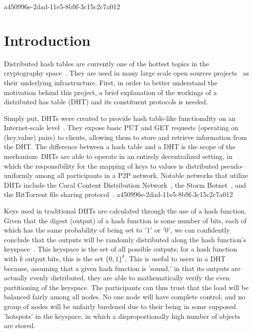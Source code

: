 \documentclass[12pt]{article}
\begin{document}
a450996e-2dad-11e5-8b9f-3c15c2c7a012\section{Introduction}
\par Distributed hash tables are currently one of the hottest topics in the cryptography space~\cite{Stoica:2001dj,Rowstron:2001ea,Ratnasamy:2001wn}. They are used in many large scale open sources projects~\cite{Freitas:2013tb,Xu:2010vs,Perfitt:2010fh} as their underlying infrastructure. First, in order to better understand the motivation behind this project, a brief explanation of the workings of a distributed has table (DHT) and its constituent protocols is needed.

\par Simply put, DHTs were created to provide hash table-like functionality on an Internet-scale level~\cite{Ratnasamy:2001wn}. They expose basic PUT and GET requests (operating on (key,value) pairs) to clients, allowing them to store and retrieve information from the DHT. The difference between a hash table and a DHT is the scope of the mechanism: DHTs are able to operate in an entirely decentralized setting, in which the responsibility for the mapping of keys to values is distributed pseudo-uniformly among all participants in a P2P network. Notable networks that utilize DHTs include the Coral Content Distribution Network~\cite{Freedman:2004vb}, the Storm Botnet~\cite{Holz:2008uk}, and the BitTorrent file sharing protocol~\cite{Cohen:y1_8mBnw}.
a450996e-2dad-11e5-8b9f-3c15c2c7a012
\par Keys used in traditional DHTs are calculated through the use of a hash function. Given that the digest (output) of a hash function is some number of bits, each of which has the same probability of being set to $'1'$ or $'0'$, we can confidently conclude that the outputs will be randomly distributed along the hash function's keyspace~. This keyspace is the set of all possible outputs; for a hash function with $k$ output bits, this is the set $\{0,1\}^k$. This is useful to users in a DHT because, assuming that a given hash function is 'sound,' in that its outputs are actually evenly distributed, they are able to mathematically verify the even partitioning of the keyspace. The participants can thus trust that the load will be balanced fairly among all nodes. No one node will have complete control, and no group of nodes will be unfairly burdened due to their being in some supposed 'hotspots' in the keyspace, in which a disproportionally high number of objects are stored.~
\end{document}
